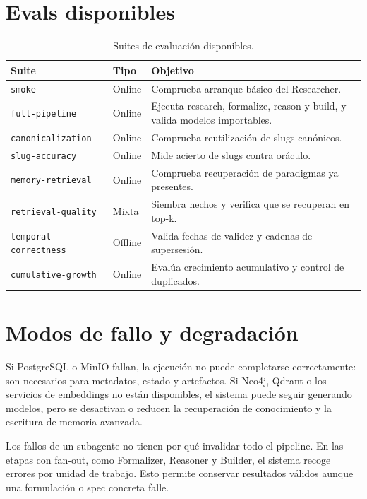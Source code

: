 \section{Evals disponibles}

\begin{table}[H]
\begin{center}
\small
\begin{tabular}{|p{4.2cm}|p{2.2cm}|p{5.7cm}|} \hline
\textbf{Suite} & \textbf{Tipo} & \textbf{Objetivo} \\ \hline
\texttt{smoke} & Online & Comprueba arranque básico del Researcher. \\ \hline
\texttt{full-pipeline} & Online & Ejecuta research, formalize, reason y build, y valida modelos importables. \\ \hline
\texttt{canonicalization} & Online & Comprueba reutilización de slugs canónicos. \\ \hline
\texttt{slug-accuracy} & Online & Mide acierto de slugs contra oráculo. \\ \hline
\texttt{memory-retrieval} & Online & Comprueba recuperación de paradigmas ya presentes. \\ \hline
\texttt{retrieval-quality} & Mixta & Siembra hechos y verifica que se recuperan en top-k. \\ \hline
\texttt{temporal-correctness} & Offline & Valida fechas de validez y cadenas de supersesión. \\ \hline
\texttt{cumulative-growth} & Online & Evalúa crecimiento acumulativo y control de duplicados. \\ \hline
\end{tabular}
\caption{Suites de evaluación disponibles.}
\end{center}
\end{table}

\section{Modos de fallo y degradación}

Si PostgreSQL o MinIO fallan, la ejecución no puede completarse correctamente:
son necesarios para metadatos, estado y artefactos. Si Neo4j, Qdrant o los
servicios de embeddings no están disponibles, el sistema puede seguir
generando modelos, pero se desactivan o reducen la recuperación de conocimiento
y la escritura de memoria avanzada.

Los fallos de un subagente no tienen por qué invalidar todo el pipeline. En las
etapas con fan-out, como Formalizer, Reasoner y Builder, el sistema recoge
errores por unidad de trabajo. Esto permite conservar resultados válidos aunque
una formulación o spec concreta falle.

